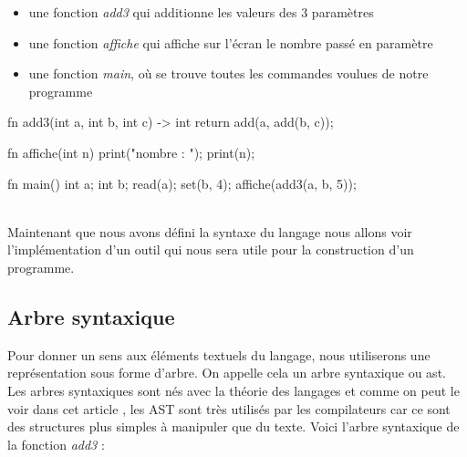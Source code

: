 \documentclass[a4paper]{article}%
\begin{document}
\begin{itemize}
  \item une fonction \textit{add3} qui additionne les valeurs des 3 paramètres\\
  \item une fonction \textit{affiche} qui affiche sur l'écran le nombre passé en paramètre\\
  \item une fonction \textit{main}, où se trouve toutes les commandes voulues de notre programme\\
\end{itemize}


\begin{grammar}[language=C++]
fn add3(int a, int b, int c) -> int {
    return add(a, add(b, c));
}

fn affiche(int n) {
    print("nombre : ");
    print(n);
}

fn main() {
    int a;
    int b;
    read(a);
    set(b, 4);
    affiche(add3(a, b, 5));
}
\end{grammar}\leavevmode\newline
~\\

Maintenant que nous avons défini la syntaxe du langage nous allons voir
l'implémentation d'un outil qui nous sera utile pour la construction d'un
programme.


\clearpage{}

\subsection{Arbre syntaxique}

Pour donner un sens aux éléments textuels du langage, nous utiliserons une
représentation sous forme d'arbre. On appelle cela un arbre syntaxique ou
\gls{ast}. Les arbres syntaxiques sont nés avec la théorie des langages et comme
on peut le voir dans cet article \cite{compilerTICH}, les AST sont très
utilisés par les compilateurs car ce sont des structures plus simples à
manipuler que du texte. Voici l'arbre syntaxique de la fonction \textit{add3} :
\end{document}
